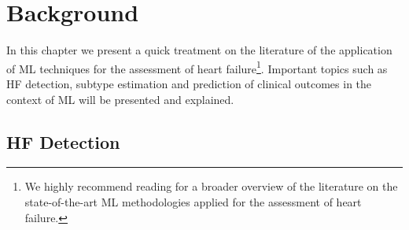 \documentclass[../thesis.tex]{subfiles}
\begin{document}
\chapter{Background}
\label{chap:back}

In this chapter we present a quick treatment on the literature of the application of ML techniques for the assessment of heart failure\footnote{We highly recommend reading \cite{tripoliti2017heart} for a broader overview of the literature on the state-of-the-art ML methodologies applied for the assessment of heart failure.}. Important topics such as HF detection, subtype estimation and prediction of clinical outcomes in the context of ML will be presented and explained.

\section{HF Detection}
\end{document}
